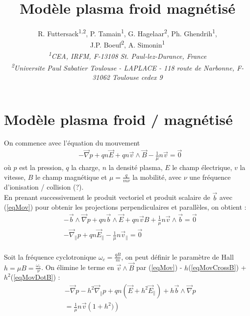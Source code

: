 \documentclass[12pt]{article}
\begin{document}


\title{Modèle plasma froid magnétisé}
\author{\small{R. Futtersack\textsuperscript{1,2},
		P. Tamain\textsuperscript{1}, 
		G. Hagelaar\textsuperscript{2}, 
		Ph. Ghendrih\textsuperscript{1},}\\ 
		\small{J.P. Boeuf\textsuperscript{2}, 
		A. Simonin\textsuperscript{1}}\\
		\scriptsize{\textit{\textsuperscript{1}CEA, IRFM, F-13108 St. Paul-lez-Durance, France}}\\
		\scriptsize{\textit{\textsuperscript{2}Universite Paul Sabatier Toulouse - LAPLACE - 118 route de Narbonne, F-31062 Toulouse cedex 9}}}
\date{}

\thispagestyle{empty}

\newpage
\section*{Modèle plasma froid / magnétisé}

On commence avec l'équation du mouvement
\begin{align}
\label{eqMov}&-\vec{\nabla}p+qn\vec{E}+qn\vec{v}\wedge\vec{B}-\frac{1}{\mu}n\vec{v}=\vec{0}
\end{align}
où $p$ est la pression, $q$ la charge, $n$ la densité plasma, $E$ le champ électrique, $v$ la vitesse, $B$ le champ magnétique
et $\mu=\frac{q}{m\nu}$ la mobilité, avec $\nu$ une fréquence d'ionisation / collision (?).
\\
En prenant successivement le produit vectoriel et produit scalaire de $\vec{b}$ avec (\ref{eqMov}) 
pour obtenir les projections perpendiculaires et parallèles, on obtient :
\begin{align}
\label{eqMovCrossB}&-\vec{b}\wedge\vec{\nabla}p+qn\vec{b}\wedge\vec{E}+qn\vec{v}B+\frac{1}{\mu}n\vec{v}\wedge\vec{b}=\vec{0}\\
\label{eqMovDotB}&-\vec{\nabla}_{\parallel}p+qn\vec{E}_{\parallel}-\frac{1}{\mu}n\vec{v}_{\parallel}=\vec{0}
\end{align}
\\
Soit la fréquence cyclotronique $\omega_c=\frac{qB}{m}$, on peut définir le paramètre de Hall 
$h=\mu B=\frac{\omega_c}{\nu}$. On élimine le terme en $\vec{v}\wedge\vec{B}$ par 
(\ref{eqMov}) - $h$(\ref{eqMovCrossB}) + $h^2$(\ref{eqMovDotB}) :
\begin{align}
&-\vec{\nabla}p-h^2\vec{\nabla}_{\parallel}p+qn\left(\vec{E}+h^2\vec{E}_{\parallel}\right)+h\vec{b}\wedge\vec{\nabla}p\\
&=\frac{1}{\mu}n\vec{v}\left(1+h^2)\right)\\
\end{align}
\end{document}
